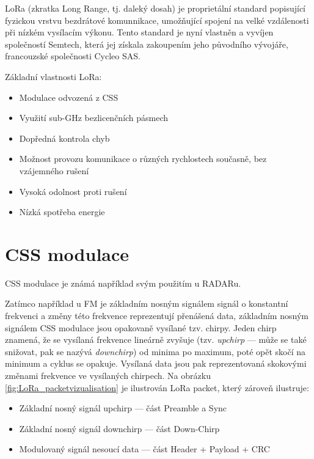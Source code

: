 LoRa (zkratka Long Range, tj. daleký dosah) je proprietální standard popisující 
fyzickou vrstvu bezdrátové komunnikace, umožňující spojení na velké vzdálenosti 
při nízkém vysílacím výkonu. Tento standard je nyní vlastněn a vyvíjen 
společností Semtech, která jej získala zakoupením jeho původního vývojáře,
francouzské společnosti Cycleo SAS.

Základní vlastnosti LoRa:
\begin{itemize}
    \item Modulace odvozená z CSS
    \item Využití sub-GHz bezlicenčních pásmech
    \item Dopředná kontrola chyb
    \item Možnost provozu komunikace o různých rychlostech současně, bez
        vzájemného rušení
    \item Vysoká odolnost proti rušení
    \item Nízká spotřeba energie
\end{itemize}

\section{CSS modulace}

    CSS modulace je známá například svým použitím u RADARu. 
    
    Zatímco například u FM je základním nosným signálem signál o konstantní 
    frekvenci a změny této frekvence reprezentují přenášená data,
    základním nosným signálem CSS modulace jsou opakovaně vysílané tzv. 
    chirpy. Jeden chirp znamená, že se vysílaná frekvence lineárně zvyšuje 
    (tzv. \emph{upchirp} --- může se také snižovat, pak se nazývá 
    \emph{downchirp}) od minima po maximum, poté opět skočí na minimum a cyklus 
    se opakuje. Vysílaná data jsou pak reprezentovaná skokovými změnami 
    frekvence ve vysílaných chirpech. Na obrázku 
    \ref{fig:LoRa_packetvizualisation} je ilustrován LoRa packet, který zároveň
    ilustruje:
    \begin{itemize}
        \item Základní nosný signál upchirp --- část Preamble a Sync
        \item Základní nosný signál downchirp --- část Down-Chirp
        \item Modulovaný signál nesoucí data --- část Header + Payload + CRC 
    \end{itemize}

